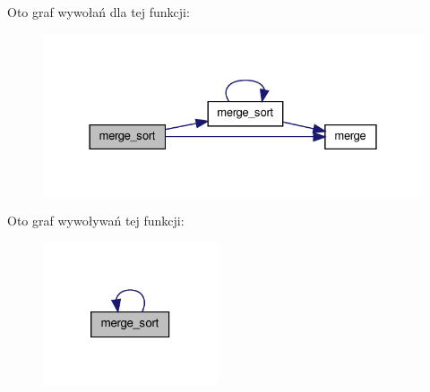 \-Oto graf wywołań dla tej funkcji\-:\nopagebreak
\begin{figure}[H]
\begin{center}
\leavevmode
\includegraphics[width=328pt]{merge_8hh_a21cc64084ad14436ca30fc77c41765d3_cgraph}
\end{center}
\end{figure}




\-Oto graf wywoływań tej funkcji\-:\nopagebreak
\begin{figure}[H]
\begin{center}
\leavevmode
\includegraphics[width=146pt]{merge_8hh_a21cc64084ad14436ca30fc77c41765d3_icgraph}
\end{center}
\end{figure}


